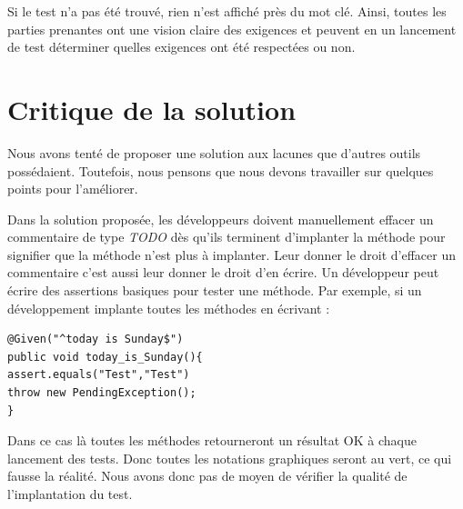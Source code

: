 Si le test n'a pas été trouvé, rien n'est affiché près du mot clé. Ainsi, toutes les parties prenantes ont une vision claire des exigences et peuvent en un lancement de test déterminer quelles exigences ont été respectées ou non.

\section{Critique de la solution}

Nous avons tenté de proposer une solution aux lacunes que d'autres outils possédaient. Toutefois, nous pensons que nous devons travailler sur quelques points pour l'améliorer.

Dans la solution proposée, les développeurs doivent manuellement effacer un commentaire de type \textit{TODO} dès qu'ils terminent d'implanter la méthode pour signifier que la méthode n'est plus à implanter. Leur donner le droit d'effacer un commentaire c'est aussi leur donner le droit d'en écrire. Un développeur peut écrire des assertions basiques pour tester une méthode. Par exemple, si un développement implante toutes les méthodes en écrivant :
\begin{lstlisting}
@Given("^today is Sunday$")
public void today_is_Sunday(){
assert.equals("Test","Test")
throw new PendingException();
}
\end{lstlisting}

Dans ce cas là toutes les méthodes retourneront un résultat OK à chaque lancement des tests. Donc toutes les notations graphiques seront au vert, ce qui fausse la réalité. Nous avons donc pas de moyen de vérifier la qualité de l'implantation du test. 

